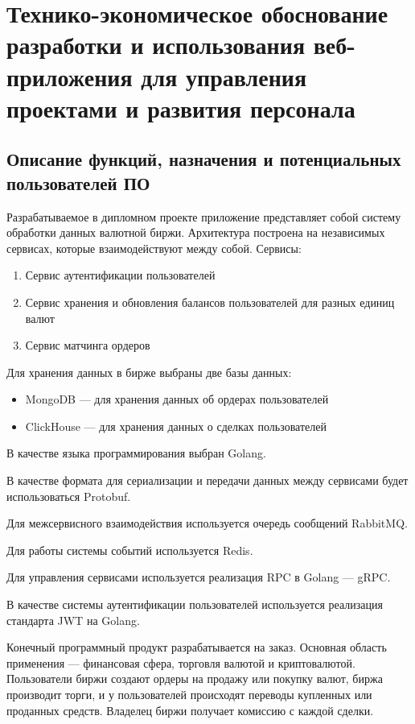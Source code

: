 \section{Технико-экономическое обоснование разработки и использования веб-приложения для управления проектами и развития персонала}\label{sec:economics}

\subsection{Описание функций, назначения и потенциальных пользователей ПО}

Разрабатываемое в дипломном проекте приложение представляет собой систему обработки данных валютной биржи. Архитектура построена на независимых сервисах, которые взаимодействуют между собой. Сервисы:
\begin{enumerate}
    \item Сервис аутентификации пользователей
    \item Сервис хранения и обновления балансов пользователей для разных единиц валют
    \item Сервис матчинга ордеров
\end{enumerate}

Для хранения данных в бирже выбраны две базы данных:
\begin{itemize}
    \item MongoDB — для хранения данных об ордерах пользователей
    \item ClickHouse — для хранения данных о сделках пользователей
\end{itemize}

В качестве языка программирования выбран Golang.

В качестве формата для сериализации и передачи данных между сервисами будет использоваться Protobuf.

Для межсервисного взаимодействия используется очередь сообщений RabbitMQ.

Для работы системы событий используется Redis.

Для управления сервисами используется реализация RPC в Golang — gRPC.

В качестве системы аутентификации пользователей используется реализация стандарта JWT на Golang.

Конечный программный продукт разрабатывается на заказ. Основная область применения — финансовая сфера, торговля валютой и криптовалютой.
Пользователи биржи создают ордеры на продажу или покупку валют, биржа производит торги, и у пользователей происходят переводы купленных или проданных средств. Владелец биржи получает комиссию с каждой сделки.

